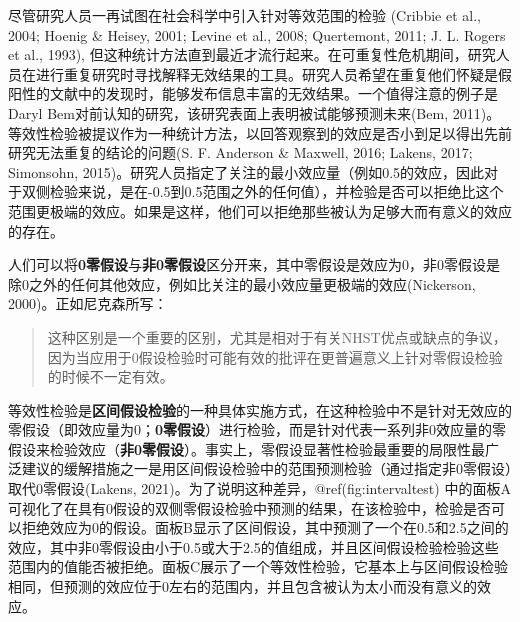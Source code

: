 \documentclass[
  letterpaper,
  DIV=11,
  numbers=noendperiod]{scrreprt}
\begin{document}
尽管研究人员一再试图在社会科学中引入针对等效范围的检验 (Cribbie et al.,
2004; Hoenig \& Heisey, 2001; Levine et al., 2008; Quertemont, 2011; J.
L. Rogers et al., 1993),
但这种统计方法直到最近才流行起来。在可重复性危机期间，研究人员在进行重复研究时寻找解释无效结果的工具。研究人员希望在重复他们怀疑是假阳性的文献中的发现时，能够发布信息丰富的无效结果。一个值得注意的例子是Daryl
Bem对前认知的研究，该研究表面上表明被试能够预测未来(Bem,
2011)。等效性检验被提议作为一种统计方法，以回答观察到的效应是否小到足以得出先前研究无法重复的结论的问题(S.
F. Anderson \& Maxwell, 2016; Lakens, 2017; Simonsohn,
2015)。研究人员指定了关注的最小效应量（例如0.5的效应，因此对于双侧检验来说，是在-0.5到0.5范围之外的任何值），并检验是否可以拒绝比这个范围更极端的效应。如果是这样，他们可以拒绝那些被认为足够大而有意义的效应的存在。

人们可以将\textbf{0零假设}与\textbf{非0零假设}区分开来，其中零假设是效应为0，非0零假设是除0之外的任何其他效应，例如比关注的最小效应量更极端的效应(Nickerson,
2000)。正如尼克森所写：

\begin{quote}
这种区别是一个重要的区别，尤其是相对于有关NHST优点或缺点的争议，因为当应用于0假设检验时可能有效的批评在更普遍意义上针对零假设检验的时候不一定有效。
\end{quote}

等效性检验是\textbf{区间假设检验}的一种具体实施方式，在这种检验中不是针对无效应的零假设（即效应量为0；\textbf{0零假设}）进行检验，而是针对代表一系列非0效应量的零假设来检验效应（\textbf{非0零假设}）。事实上，零假设显著性检验最重要的局限性最广泛建议的缓解措施之一是用区间假设检验中的范围预测检验（通过指定非0零假设）取代0零假设(Lakens,
2021)。为了说明这种差异，@ref(fig:intervaltest)
中的面板A可视化了在具有0假设的双侧零假设检验中预测的结果，在该检验中，检验是否可以拒绝效应为0的假设。面板B显示了区间假设，其中预测了一个在0.5和2.5之间的效应，其中非0零假设由小于0.5或大于2.5的值组成，并且区间假设检验检验这些范围内的值能否被拒绝。面板C展示了一个等效性检验，它基本上与区间假设检验相同，但预测的效应位于0左右的范围内，并且包含被认为太小而没有意义的效应。
\end{document}
